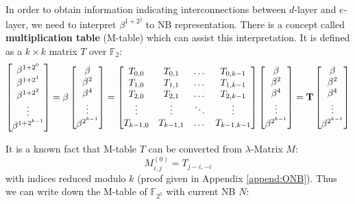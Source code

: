 \begin{Example}
In order to obtain information 
indicating interconnections between $d$-layer and $e$-layer, we need to interpret $\beta^{1+2^j}$ 
to NB representation.
There is a concept called {\bf multiplication table} (M-table) which can assist this interpretation. It is defined as 
a $k\times k$ matrix $T$ over $\mathbb F_2$:
\begin{equation}
\label{eqn:multitable}
\begin{bmatrix}
\beta^{1+2^0} \\ \beta^{1+2^1} \\ \beta^{1+2^2} \\ \vdots \\ \beta^{1+2^{k-1}}
\end{bmatrix}
= \beta
\begin{bmatrix}
\beta \\ \beta^2 \\ \beta^4 \\ \vdots \\ \beta^{2^{k-1}}
\end{bmatrix}
=
\begin{bmatrix}
T_{0,0}      &   T_{0,1}        & \dots & T_{0,k-1}\\
T_{1,0}    &   T_{1,1}           & \dots & T_{1,k-1}\\
T_{2,0}    &   T_{2,1}           & \dots & T_{2,k-1}\\
\vdots & \vdots              & \ddots     & \vdots \\
T_{k-1,0}    &   T_{k-1,1}           & \dots & T_{k-1,k-1}
\end{bmatrix}
\begin{bmatrix}
\beta \\ \beta^2 \\ \beta^4 \\ \vdots \\ \beta^{2^{k-1}}
\end{bmatrix}
= {\bf T}
\begin{bmatrix}
\beta \\ \beta^2 \\ \beta^4 \\ \vdots \\ \beta^{2^{k-1}}
\end{bmatrix}
\end{equation}

It is a known fact that M-table $T$ can be converted from $\lambda$-Matrix $M$:
$$M_{i,j}^{(0)} = T_{j-i,-i}$$
with indices reduced modulo $k$ (proof given in Appendix \ref{append:ONB}). Thus we can write down the M-table of $\mathbb F_{2^5}$ with current NB $N$:


\end{Example}
